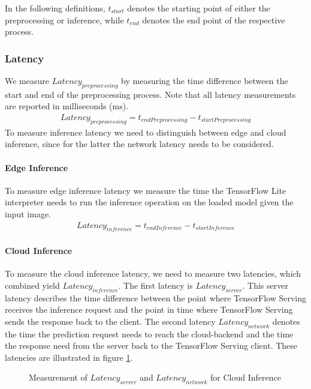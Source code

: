 In the following definitions, $t_{start}$ denotes the starting point of either the preprocessing or inference, while $t_{end}$ denotes the end point of the respective process.
\subsubsection{Latency}
We measure $Latency_{preprocessing}$ by measuring the time difference between the start and end of the preprocessing process.
Note that all latency measurements are reported in milliseconds (ms).
\begin{equation*}
\begin{gathered}
Latency_{preprocessing} = t_{endPreprocessing} - t_{startPreprocessing}
\end{gathered}
\end{equation*}
To measure inference latency we need to distinguish between edge and cloud inference, since for the latter the network latency needs to be considered.

\paragraph{Edge Inference}To measure edge inference latency we measure the time the TensorFlow Lite interpreter needs to run the inference operation on the loaded model given the input image.
\begin{equation*}
\begin{gathered}
Latency_{inference} = t_{endInference} - t_{startInference}
\end{gathered}
\end{equation*}
\paragraph{Cloud Inference}
To measure the cloud inference latency, we need to measure two latencies, which combined yield $Latency_{inference}$. The first latency is  $Latency_{server}$. This server latency describes the time difference between the point where TensorFlow Serving receives the inference request and the point in time where TensorFlow Serving sends the response back to the client.
The second latency $Latency_{network}$ denotes the time the prediction request needs to reach the cloud-backend and the time the response need from the server back to the TensorFlow Serving client.
These latencies are illustrated in figure \ref{fig:serverLat}.
\begin{figure}[!htb]
\centering

\caption{Measurement of $Latency_{server}$ and $Latency_{network}$ for Cloud Inference}
\label{fig:serverLat}
\end{figure}


